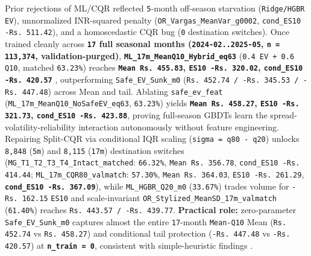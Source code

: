 \documentclass[11pt,a4paper]{article}
\begin{document}
Prior rejections of ML/CQR reflected \texttt{5}-month off-season starvation (\texttt{Ridge/HGBR EV}), unnormalized INR-squared penalty (\texttt{OR\_Vargas\_MeanVar\_g0002}, \texttt{cond\_ES10 -Rs.\,511.42}), and a homoscedastic CQR bug (\texttt{0} destination switches). Once trained cleanly across \textbf{\texttt{17} full seasonal months (\texttt{2024-02..2025-05}, \texttt{n = 113,374}, validation-purged)}, \textbf{\texttt{ML\_17m\_MeanQ10\_Hybrid\_eq63}} (\texttt{0.4 EV + 0.6 Q10}, matched \texttt{63.23\%}) reaches \textbf{\texttt{Mean Rs.\,455.83}, \texttt{ES10 -Rs.\,320.02}, \texttt{cond\_ES10 -Rs.\,420.57}} \citep{romano2019conformalized,lei2018distribution,gibbs2021adaptive}, outperforming \texttt{Safe\_EV\_Sunk\_m0} (\texttt{Rs.\,452.74 / -Rs.\,345.53 / -Rs.\,447.48}) across Mean and tail. Ablating \texttt{safe\_ev\_feat} (\texttt{ML\_17m\_MeanQ10\_NoSafeEV\_eq63}, \texttt{63.23\%}) yields \textbf{\texttt{Mean Rs.\,458.27}, \texttt{ES10 -Rs.\,321.73}, \texttt{cond\_ES10 -Rs.\,423.88}}, proving full-season GBDTs learn the spread-volatility-reliability interaction autonomously without feature engineering. Repairing Split-CQR via conditional IQR scaling (\texttt{sigma = q80 - q20}) unlocks \texttt{8,848} (\texttt{5m}) and \texttt{8,115} (\texttt{17m}) destination switches (\texttt{MG\_T1\_T2\_T3\_T4\_Intact\_matched}: \texttt{66.32\%}, \texttt{Mean Rs.\,356.78}, \texttt{cond\_ES10 -Rs.\,414.44}; \texttt{ML\_17m\_CQR80\_valmatch}: \texttt{57.30\%}, \texttt{Mean Rs.\,364.03}, \texttt{ES10 -Rs.\,261.29}, \textbf{\texttt{cond\_ES10 -Rs.\,367.09}}), while \texttt{ML\_HGBR\_Q20\_m0} (\texttt{33.67\%}) trades volume for \texttt{-Rs.\,162.15} \texttt{ES10} and scale-invariant \texttt{OR\_Stylized\_MeanSD\_17m\_valmatch} (\texttt{61.40\%}) reaches \texttt{Rs.\,443.57 / -Rs.\,439.77}. \textbf{Practical role:} zero-parameter \texttt{Safe\_EV\_Sunk\_m0} captures almost the entire \texttt{17}-month \texttt{Mean-Q10} Mean (\texttt{Rs.\,452.74} vs \texttt{Rs.\,458.27}) and conditional tail protection (\texttt{-Rs.\,447.48} vs \texttt{-Rs.\,420.57}) at \textbf{\texttt{n\_train = 0}}, consistent with simple-heuristic findings \citep{demiguel2009optimal,gigerenzer2011heuristic}.
\end{document}

